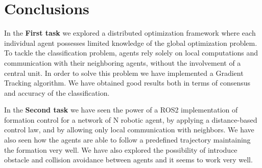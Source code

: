 \documentclass[a4paper,11pt,oneside]{book}
\begin{document}
\chapter*{Conclusions}
In the \textbf{First task} we explored a distributed optimization framework where each individual agent possesses limited knowledge of the global optimization problem. To tackle the classification problem, agents rely solely on local computations and communication with their neighboring agents, without the involvement of a central unit. In order to solve this problem we have implemented a Gradient Tracking algorithm. 
We have obtained good results both in terms of consensus and accuracy of the classification. 

\bigskip
In the \textbf{Second task} we have seen the power of a ROS2 implementation of formation control for a network of N robotic agent, by applying a distance-based control law, and by allowing only local communication with neighbors. We have also seen how the agents are able to follow a predefined trajectory maintaining the formation very well.
We have also explored the possibility of introduce obstacle and collision avoidance between agents and it seems to work very well.


%


\end{document}
